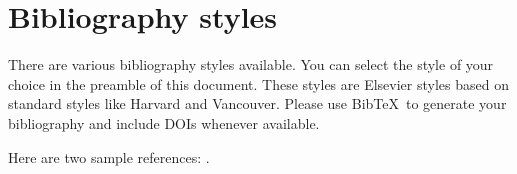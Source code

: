 \documentclass[review]{elsarticle}
\begin{document}
\section{Bibliography styles}

There are various bibliography styles available. You can select the style of your choice in the preamble of this document. These styles are Elsevier styles based on standard styles like Harvard and Vancouver. Please use Bib\TeX\ to generate your bibliography and include DOIs whenever available.

Here are two sample references: \cite{Feynman1963118,Dirac1953888}.


\end{document}
